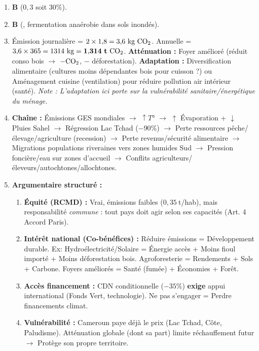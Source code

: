 \documentclass[11pt]{article}
\begin{document}
\begin{corrige}
\begin{enumerate}
\item \textbf{B} ($0{,}3$ soit $30\%$).
\item \textbf{B} (, fermentation anaérobie dans sols inondés).
\item Émission journalière = $2 \times 1{,}8 = 3{,}6\ \text{kg}\ \ce{CO2}$. Annuelle = $3{,}6 \times 365 = 1314\ \text{kg} = \mathbf{1{,}314\ t\ \ce{CO2}}$. \textbf{Atténuation :} Foyer amélioré (réduit conso bois $\rightarrow$ $- \ce{CO2}$, $-$ déforestation). \textbf{Adaptation :} Diversification alimentaire (cultures moins dépendantes bois pour cuisson ?) ou Aménagement cuisine (ventilation) pour réduire pollution air intérieur (santé). \textit{Note : L'adaptation ici porte sur la vulnérabilité sanitaire/énergétique du ménage.}
\item \textbf{Chaîne :} Émissions GES mondiales $\rightarrow$ $\uparrow T°$ $\rightarrow$ $\uparrow$ Évaporation + $\downarrow$ Pluies Sahel $\rightarrow$ Régression Lac Tchad ($-90\%$) $\rightarrow$ Perte ressources pêche/élevage/agriculture (recession) $\rightarrow$ Perte revenus/sécurité alimentaire $\rightarrow$ Migrations populations riveraines vers zones humides Sud $\rightarrow$ Pression foncière/eau sur zones d'accueil $\rightarrow$ Conflits agriculteurs/éleveurs/autochtones/allochtones.
\item \textbf{Argumentaire structuré :}
\begin{enumerate}
\item \textbf{Équité (RCMD) :} Vrai, émissions faibles ($0{,}35\ \text{t}$/hab), mais responsabilité \emph{commune} : tout pays doit agir selon ses capacités (Art. 4 Accord Paris).
\item \textbf{Intérêt national (Co-bénéfices) :} Réduire émissions = Développement durable. Ex: Hydroélectricité/Solaire = Énergie accès + Moins fioul importé + Moins déforestation bois. Agroforesterie = Rendements + Sols + Carbone. Foyers améliorés = Santé (fumée) + Économies + Forêt.
\item \textbf{Accès financement :} CDN conditionnelle ($-35\%$) \textbf{exige} appui international (Fonds Vert, technologie). Ne pas s'engager = Perdre financements climat.
\item \textbf{Vulnérabilité :} Cameroun paye déjà le prix (Lac Tchad, Côte, Paludisme). Atténuation globale (dont sa part) limite réchauffement futur $\rightarrow$ Protège son propre territoire.
\end{enumerate}
\end{enumerate}
\end{corrige}
\end{document}
